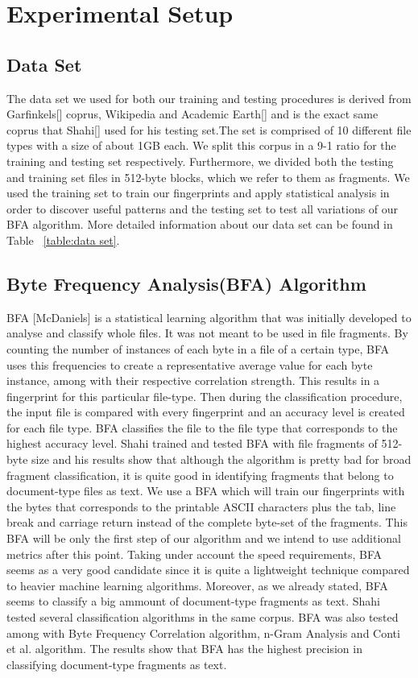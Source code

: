 \chapter{Experimental Setup}


\section{Data Set}
The data set we used for both our training and testing procedures is derived from  Garfinkels[] coprus, Wikipedia and Academic Earth[] and is the exact same coprus that Shahi[] used for his testing set.The set is comprised of 10 different file types with a size of about 1GB each. We split this corpus in a 9-1 ratio for the training and testing set respectively. 
Furthermore, we divided both the testing and training set files in 512-byte blocks, which we refer to them as fragments. We used the training set to train our fingerprints and apply statistical analysis in order to discover useful patterns and the testing set to test all variations of our BFA algorithm. More detailed information about our data set can be found in Table ~\ref{table:data set}.




\section{Byte Frequency Analysis(BFA) Algorithm}
BFA [McDaniels] is a statistical learning algorithm that was initially developed to analyse and classify whole files. It was not meant to be used in file fragments. By counting the number of instances of each byte in a file of a certain type, BFA uses this frequencies to create a representative average value for each byte instance, among with their respective correlation strength. This results in a fingerprint for this particular file-type. Then during the classification procedure, the input file is compared with every fingerprint and an accuracy level is created for each file type. BFA classifies the file to the file type that corresponds to the highest accuracy level.
 Shahi trained and tested BFA with file fragments of 512-byte size and his results show that although the algorithm is pretty bad for broad fragment classification, it is quite good in identifying fragments that belong to document-type files as text. We use a BFA which will train our fingerprints with the bytes that corresponds to the printable ASCII characters plus the tab, line break and carriage return instead of the complete byte-set of the fragments. This BFA will be only the first step of our algorithm and we intend to use additional metrics after this point. Taking under account the speed requirements, BFA seems as a very good candidate since it is quite a lightweight technique compared to heavier machine learning algorithms. Moreover, as we already stated, BFA seems to classify a big ammount of document-type fragments as text. Shahi tested several classification algorithms in the same corpus. BFA was also tested among with Byte Frequency Correlation algorithm, n-Gram Analysis and Conti et al. algorithm. The results show that BFA has the highest precision in classifying document-type fragments as text.



